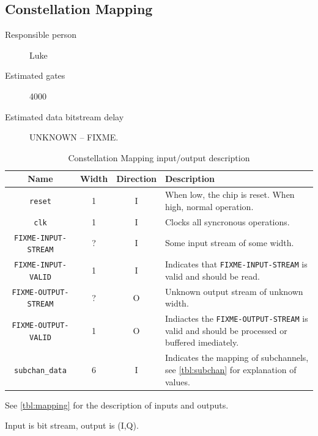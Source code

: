 \documentclass[dvips,10pt,twocolumn]{article}
\newcommand{\wire}{\texttt}
\begin{document}

\subsection{Constellation Mapping}
\label{sec:constellation}
\begin{description}
	\item[Responsible person] Luke
	\item[Estimated gates] 4000
	\item[Estimated data bitstream delay] UNKNOWN -- FIXME.
\end{description}

\begin{table} \begin{tabularx}{\textwidth}{c|c|c|X}
	\label{tbl:mapping-io}
	Name & Width & Direction & Description \\ \hline

	\wire{reset} & 1 & I & When low, the chip is reset. When high, normal
	operation. \\

	\wire{clk}   & 1 & I & Clocks all syncronous operations. \\

	\wire{FIXME-INPUT-STREAM} & ? & I & Some input stream of some width.
	\\

	\wire{FIXME-INPUT-VALID} & 1 & I & Indicates that
	\wire{FIXME-INPUT-STREAM} is valid and should be read. \\

	\wire{FIXME-OUTPUT-STREAM} & ? & O & Unknown output stream of unknown
	width. \\

	\wire{FIXME-OUTPUT-VALID} & 1 & O & Indiactes the
	\wire{FIXME-OUTPUT-STREAM} is valid and should be processed or
	buffered imediately. \\

	\wire{subchan\_data} & 6 & I & Indicates the mapping of subchannels, see
	\autoref{tbl:subchan} for explanation of values. \\

\end{tabularx} \caption{Constellation Mapping input/output description}
\end{table}

See \autoref{tbl:mapping} for the description of inputs and outputs.

Input is bit stream, output is (I,Q).
\end{document}

